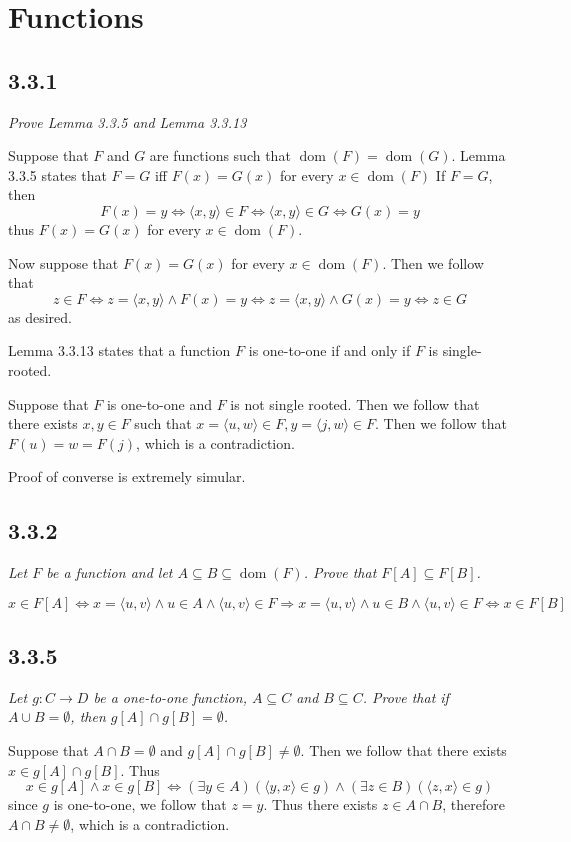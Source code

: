 \documentclass[11pt,oneside,titlepage]{book}
\DeclareMathOperator \lra {\Leftrightarrow}
\DeclareMathOperator \ra {\Rightarrow}
\DeclareMathOperator \dom {dom}
\newcommand{\eangle}[1]{\langle #1 \rangle}
\begin{document}
\section{Functions}

\subsection*{3.3.1}

\textit{Prove Lemma 3.3.5 and Lemma 3.3.13}

Suppose that $F$ and $G$ are functions such that $\dom(F) = \dom(G)$. 
Lemma 3.3.5 states that $F = G$ iff $F(x) = G(x)$ for every $x \in \dom(F)$
If $F = G$, then
$$F(x) = y \lra \eangle{x, y} \in F \lra \eangle{x, y} \in G \lra G(x) = y$$
thus $F(x) = G(x)$ for every $x \in \dom(F)$.

Now suppose that $F(x) = G(x)$ for every $x \in \dom(F)$. Then we follow that
$$z \in F \lra z = \eangle{x, y} \land F(x) = y \lra
z = \eangle{x, y} \land G(x) = y \lra z \in G$$
as desired.

Lemma 3.3.13 states that a function $F$ is one-to-one if and only if $F$ is single-rooted.

Suppose that $F$ is one-to-one and $F$ is not single rooted. Then we follow that
there exists $x, y \in F$ such that $x = \eangle{u, w} \in F, y = \eangle{j, w} \in F$.
Then we follow that $F(u) = w = F(j)$, which is a contradiction.

Proof of converse is extremely simular.

\subsection*{3.3.2}

\textit{Let $F$ be a function and let $A \subseteq B \subseteq \dom(F)$. Prove that
  $F[A] \subseteq F[B]$.}

$$x \in F[A] \lra x = \eangle{u, v} \land u \in A \land \eangle{u, v} \in F \ra
x = \eangle{u, v} \land u \in B \land \eangle{u, v} \in F \lra x \in F[B]$$

\subsection*{3.3.5}

\textit{Let $g: C \to D$ be a one-to-one function, $A \subseteq C$ and $B \subseteq C$. Prove
  that if $A \cup B = \emptyset$, then $g[A] \cap g[B] = \emptyset$.}

Suppose that $A \cap B = \emptyset$ and $g[A] \cap g[B] \neq \emptyset$. Then we follow that
there exists $x \in g[A] \cap g[B]$. Thus
$$x \in g[A] \land x \in g[B] \lra (\exists y \in A)(\eangle{y, x} \in g) \land
(\exists z \in B)(\eangle{z, x} \in g)$$
since $g$ is one-to-one, we follow that $z = y$. Thus there exists $z \in A \cap B$, therefore
$A \cap B \neq \emptyset$, which is a contradiction.
\end{document}
